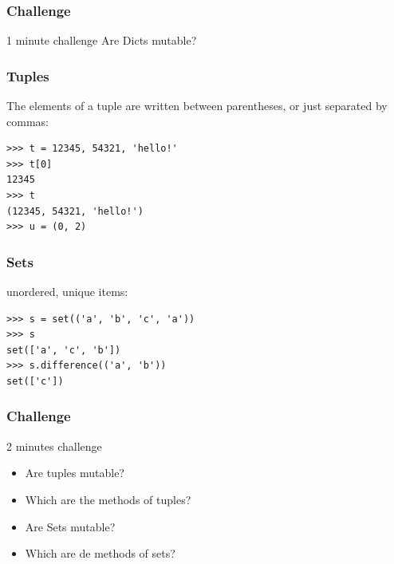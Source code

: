 \documentclass[colorlinks]{beamer}
\begin{document}
\begin{frame}[fragile]\frametitle{Challenge}
\begin{block}{1 minute challenge}
Are Dicts mutable?
\end{block}
\end{frame}

\begin{frame}[fragile]\frametitle{Tuples}
\begin{block}{The elements of a tuple are written between parentheses, or just separated by commas:}
\begin{verbatim}
>>> t = 12345, 54321, 'hello!'
>>> t[0]
12345
>>> t
(12345, 54321, 'hello!')
>>> u = (0, 2)
\end{verbatim}

\end{block}
\end{frame}

\begin{frame}[fragile]\frametitle{Sets}
\begin{block}{unordered, unique items:}
\begin{verbatim}
>>> s = set(('a', 'b', 'c', 'a'))
>>> s
set(['a', 'c', 'b'])
>>> s.difference(('a', 'b'))
set(['c'])
\end{verbatim}

\end{block}
\end{frame}

\begin{frame}[fragile]\frametitle{Challenge}
  \begin{block}{2 minutes challenge}
\begin{itemize}
    \item Are tuples mutable?
\item Which are the methods of tuples?
\item Are Sets mutable?
\item Which are de methods of sets?
\end{itemize}
  
  \end{block}
\end{frame}
\end{document}
